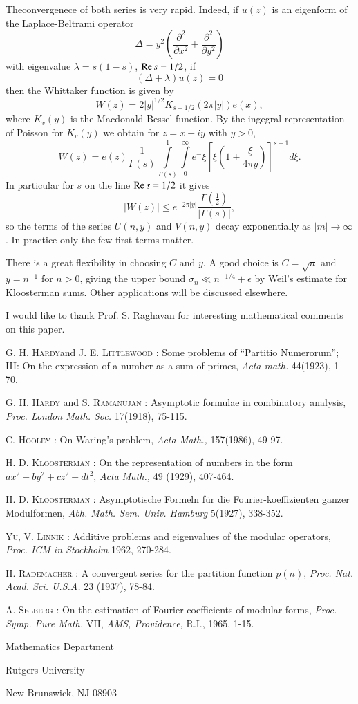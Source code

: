 \begin{remarks*}
The\pageoriginale convergenece of both series is very rapid. Indeed, if $u(z)$ is an eigenform of the Laplace-Beltrami operator 
$$
\Delta = y^2 \left(\frac{\partial^2}{\partial x^2} + \frac{\partial^2}{\partial y^2} \right)
$$
with eigenvalue $\lambda = s(1-s)$, $\operatorname{Re} s = 1/2$, \ie if
$$
(\Delta + \lambda) u (z) =0
$$
then the Whittaker function is given by 
$$
W(z)  = 2 |y|^{1/2} K_{s-1/2} (2\pi|y|) e (x),
$$
where $K_v (y)$ is the Macdonald Bessel function. By the ingegral representation of Poisson for $K_v(y)$ we obtain for $z = x + iy$ with $y>0$,
$$
W (z) = e (z) \frac{1}{\Gamma(s)} \int\limits^1_{\Gamma (s)} \int\limits^\infty_0 e^{-} \xi \left[\xi \left(1+ \frac{\xi}{4 \pi y} \right) \right]^{s-1} d \xi.
$$
In particular for $s$ on the line $\operatorname{Re} s = 1/2$ it gives
$$
|W(z)| \leqslant e^{-2 \pi |y|} \frac{\Gamma (\frac{1}{2})}{|\Gamma (s)|},
$$
so the terms of the series $U(n,y)$ and $V(n,y)$ decay exponentially as $|m| \to \infty$. In practice only the few first terms matter.

There is a great flexibility in choosing $C$ and $y$. A good choice is $C = \sqrt{n}$ and $y = n^{-1}$ for $n >0$, giving the upper bound $\sigma_n \ll n^{-1/4}+ \epsilon$ by Weil's estimate for Kloosterman sums. Other applications will be discussed elsewhere.

I would like to thank Prof. S. Raghavan for interesting mathematical comments on this paper.
\end{remarks*}

\begin{thebibliography}{99}
 \textsc{G. H. Hardy}\pageoriginale and \textsc{J. E. Littlewood} : Some problems of ``Partitio Numerorum''; III: On the expression of a number as a sum of primes, \textit{Acta math.} 44(1923), 1-70.

 \textsc{G. H. Hardy} and \textsc{S. Ramanujan} : Asymptotic formulae in combinatory analysis, \textit{Proc. London Math. Soc.} 17(1918), 75-115.

 \textsc{C. Hooley} : On Waring's problem, \textit{Acta Math.,} 157(1986), 49-97.

 \textsc{H. D. Kloosterman} : On the representation of numbers in the form $ax^2 + by^2 + cz^2+ dt^2$, \textit{Acta Math.,} 49 (1929), 407-464.

 \textsc{H. D. Kloosterman} : Asymptotische Formeln f\"ur die Fourier-koeffizienten ganzer Modulformen, \textit{Abh. Math. Sem. Univ. Hamburg} 5(1927), 338-352.

 \textsc{Yu, V. Linnik} : Additive problems and eigenvalues of the modular operators, \textit{Proc. ICM in Stockholm} 1962, 270-284.
 
 \textsc{H. Rademacher} : A convergent series for the partition function $p(n)$, \textit{Proc. Nat. Acad. Sci. U.S.A.} 23 (1937), 78-84.

 \textsc{A. Selberg} : On the estimation of Fourier coefficients of modular forms, \textit{Proc. Symp. Pure Math.} VII, \textit{AMS, Providence,} R.I., 1965, 1-15.
\end{thebibliography}

\medskip
\noindent
{\small Mathematics Department}

\noindent
{\small Rutgers University}

\noindent
{\small New Brunswick, NJ 08903}
